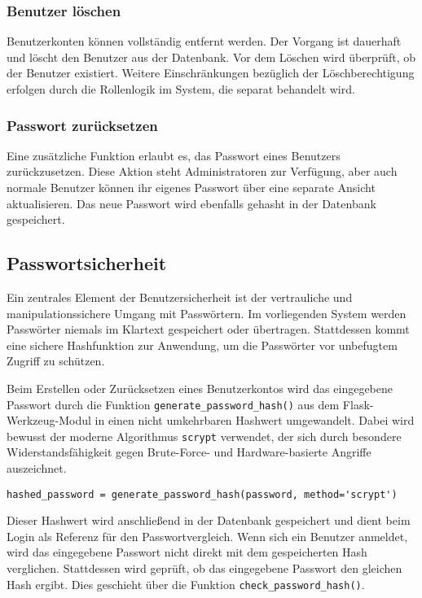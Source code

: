 \documentclass[12pt]{article}
\begin{document}
\subsubsection*{Benutzer löschen}

Benutzerkonten können vollständig entfernt werden. Der Vorgang ist dauerhaft und löscht den Benutzer aus der Datenbank. Vor dem Löschen wird überprüft, ob der Benutzer existiert. Weitere Einschränkungen bezüglich der Löschberechtigung erfolgen durch die Rollenlogik im System, die separat behandelt wird.

\subsubsection*{Passwort zurücksetzen}

Eine zusätzliche Funktion erlaubt es, das Passwort eines Benutzers zurückzusetzen. Diese Aktion steht Administratoren zur Verfügung, aber auch normale Benutzer können ihr eigenes Passwort über eine separate Ansicht aktualisieren. Das neue Passwort wird ebenfalls gehasht in der Datenbank gespeichert.


\subsection{Passwortsicherheit}

Ein zentrales Element der Benutzersicherheit ist der vertrauliche und manipulationssichere Umgang mit Passwörtern. Im vorliegenden System werden Passwörter niemals im Klartext gespeichert oder übertragen. Stattdessen kommt eine sichere Hashfunktion zur Anwendung, um die Passwörter vor unbefugtem Zugriff zu schützen.

\noindent Beim Erstellen oder Zurücksetzen eines Benutzerkontos wird das eingegebene Passwort durch die Funktion \texttt{generate\_password\_hash()} aus dem Flask-Werkzeug-Modul in einen nicht umkehrbaren Hashwert umgewandelt. Dabei wird bewusst der moderne Algorithmus \texttt{scrypt} verwendet, der sich durch besondere Widerstandsfähigkeit gegen Brute-Force- und Hardware-basierte Angriffe auszeichnet.


\begin{verbatim}
hashed_password = generate_password_hash(password, method='scrypt')
\end{verbatim}

\noindent Dieser Hashwert wird anschließend in der Datenbank gespeichert und dient beim Login als Referenz für den Passwortvergleich. Wenn sich ein Benutzer anmeldet, wird das eingegebene Passwort nicht direkt mit dem gespeicherten Hash verglichen. Stattdessen wird geprüft, ob das eingegebene Passwort den gleichen Hash ergibt. Dies geschieht über die Funktion \texttt{check\_password\_hash()}.
\end{document}
